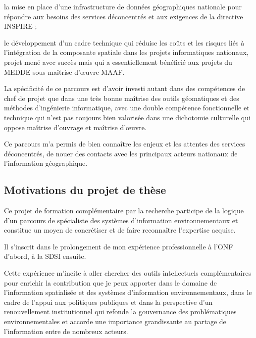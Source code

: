 \startitemize

\item la mise en place d'une infrastructure
      de données géographiques nationale pour répondre aux besoins
      des services déconcentrés et aux exigences
      de la directive INSPIRE ;
      
\item le développement d'un cadre technique
      qui réduise les coûts et les risques liés
      à l'intégration de la composante spatiale
      dans les projets informatiques nationaux,
      projet mené avec succès mais
      qui a essentiellement bénéficié aux projets du MEDDE
      sous maîtrise d’œuvre MAAF.

\stopitemize

La spécificité de ce parcours est d'avoir investi autant dans
des compétences de chef de projet que dans une très bonne maîtrise
des outils géomatiques et des méthodes d'ingénierie informatique,
avec une double compétence fonctionnelle
et technique qui n'est pas toujours bien valorisée dans une dichotomie
culturelle qui oppose maîtrise d'ouvrage et maîtrise d’œuvre.

Ce parcours m'a permis de bien connaître les enjeux et les attentes
des services déconcentrés, de nouer des contacts avec les principaux
acteurs nationaux de l'information géographique.


\subsection
{Motivations du projet de thèse}

Ce projet de formation complémentaire par la recherche 
participe de la logique d'un parcours de spécialiste
des systèmes d'information environnementaux
et constitue un moyen de concrétiser et de faire reconnaître
l'expertise acquise.

Il s'inscrit dans le
prolongement de mon expérience professionnelle à l'ONF d'abord,
à la SDSI ensuite.

Cette expérience m'incite à aller chercher des outils intellectuels
complémentaires pour enrichir la contribution que je peux apporter
dans le domaine de l'information spatialisée et des systèmes
d'information environnementaux,
dans le cadre de l'appui aux politiques publiques et dans la perspective
d'un renouvellement institutionnel qui refonde la gouvernance
des problématiques environnementales et accorde une importance
grandissante au partage de l'information entre de nombreux acteurs.

